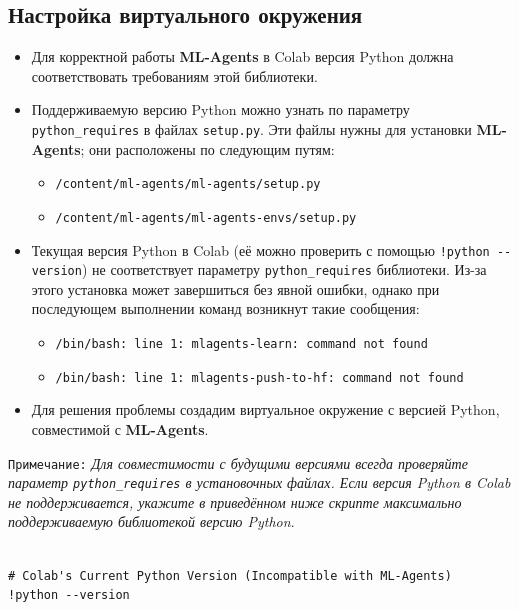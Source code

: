 \documentclass[11pt,a4paper]{article}
\begin{document}
\subsection{Настройка виртуального окружения}\label{setup-the-virtual-environment}

\begin{itemize}
\item
  Для корректной работы \textbf{ML-Agents} в Colab версия Python должна соответствовать требованиям этой библиотеки.
\item
  Поддерживаемую версию Python можно узнать по параметру \texttt{python\_requires} в файлах \texttt{setup.py}. Эти файлы нужны для установки \textbf{ML-Agents}; они расположены по следующим путям:

  \begin{itemize}
  \tightlist
  \item
    \texttt{/content/ml-agents/ml-agents/setup.py}
  \item
    \texttt{/content/ml-agents/ml-agents-envs/setup.py}
  \end{itemize}
\item
  Текущая версия Python в Colab (её можно проверить с помощью \texttt{!python\ -\/-version}) не соответствует параметру \texttt{python\_requires} библиотеки. Из-за этого установка может завершиться без явной ошибки, однако при последующем выполнении команд возникнут такие сообщения:

  \begin{itemize}
  \tightlist
  \item
    \texttt{/bin/bash:\ line\ 1:\ mlagents-learn:\ command\ not\ found}
  \item
    \texttt{/bin/bash:\ line\ 1:\ mlagents-push-to-hf:\ command\ not\ found}
  \end{itemize}
\item
  Для решения проблемы создадим виртуальное окружение с версией Python, совместимой с \textbf{ML-Agents}.
\end{itemize}

\texttt{Примечание:} \emph{Для совместимости с будущими версиями всегда проверяйте параметр \texttt{python\_requires} в установочных файлах. Если версия Python в Colab не поддерживается, укажите в приведённом ниже скрипте максимально поддерживаемую библиотекой версию Python}.

\begin{lstlisting}

# Colab's Current Python Version (Incompatible with ML-Agents)
!python --version
\end{lstlisting}
\end{document}
